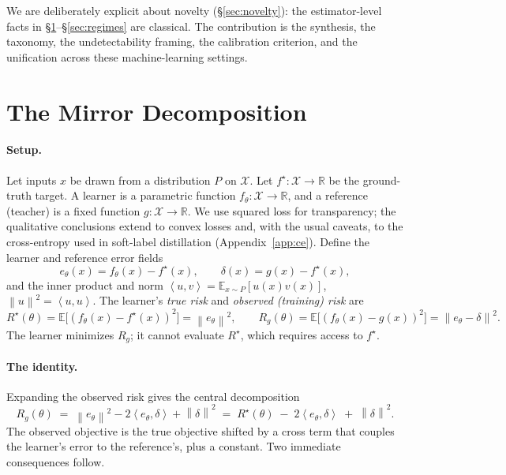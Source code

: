 \documentclass[10pt]{article} %
\theoremstyle{plain}
\theoremstyle{remark}
\newcommand{\E}{\mathbb{E}}
\newcommand{\R}{\mathbb{R}}
\newcommand{\fstar}{f^{\star}}
\newcommand{\norm}[1]{\left\lVert #1 \right\rVert}
\newcommand{\inner}[2]{\left\langle #1, #2 \right\rangle}
\begin{document}
We are deliberately explicit about novelty (\S\ref{sec:novelty}): the estimator-level facts in \S\ref{sec:decomp}--\S\ref{sec:regimes} are classical. The contribution is the synthesis, the taxonomy, the undetectability framing, the calibration criterion, and the unification across these machine-learning settings.

\section{The Mirror Decomposition}
\label{sec:decomp}

\paragraph{Setup.} Let inputs $x$ be drawn from a distribution $P$ on $\mathcal{X}$. Let $\fstar:\mathcal{X}\to\R$ be the ground-truth target. A learner is a parametric function $f_\theta:\mathcal{X}\to\R$, and a reference (teacher) is a fixed function $g:\mathcal{X}\to\R$. We use squared loss for transparency; the qualitative conclusions extend to convex losses and, with the usual caveats, to the cross-entropy used in soft-label distillation (Appendix~\ref{app:ce}). Define the learner and reference error fields
\[
e_\theta(x) = f_\theta(x) - \fstar(x), \qquad \delta(x) = g(x) - \fstar(x),
\]
and the inner product and norm $\inner{u}{v} = \E_{x\sim P}[u(x)v(x)]$, $\norm{u}^2 = \inner{u}{u}$. The learner's \emph{true risk} and \emph{observed (training) risk} are
\[
R^\star(\theta) = \E\big[(f_\theta(x)-\fstar(x))^2\big] = \norm{e_\theta}^2,
\qquad
R_g(\theta) = \E\big[(f_\theta(x)-g(x))^2\big] = \norm{e_\theta - \delta}^2 .
\]
The learner minimizes $R_g$; it cannot evaluate $R^\star$, which requires access to $\fstar$.

\paragraph{The identity.} Expanding the observed risk gives the central decomposition
\begin{equation}
R_g(\theta) \;=\; \norm{e_\theta}^2 - 2\inner{e_\theta}{\delta} + \norm{\delta}^2
\;=\; R^\star(\theta) \;-\; 2\inner{e_\theta}{\delta} \;+\; \norm{\delta}^2 .
\label{eq:risk-decomp}
\end{equation}
The observed objective is the true objective shifted by a cross term that couples the learner's error to the reference's, plus a constant. Two immediate consequences follow.
\end{document}
